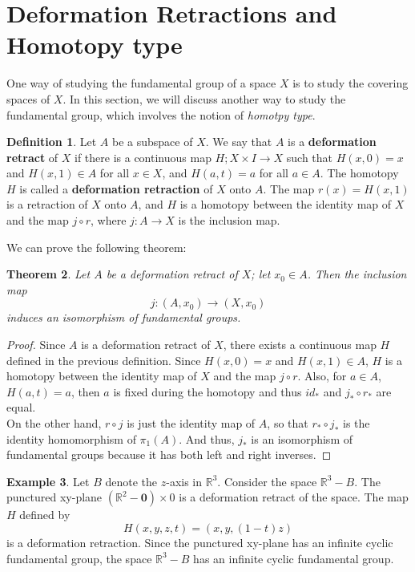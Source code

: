 \documentclass[psamsfonts]{amsart}
\newtheorem{thm}{Theorem}[section]
\theoremstyle{definition}
\newtheorem{defn}[thm]{Definition}
\newtheorem{exmp}[thm]{Example}
\theoremstyle{remark}
\numberwithin{equation}{section}
\begin{document}
\section{Deformation Retractions and Homotopy type}
	One way of studying the fundamental group of a space $X$ is to study the covering spaces of $X$. In this section, we will discuss another way to study the fundamental group, which involves the notion of \textit{homotpy type}.
	\begin{defn}
		Let $A$ be a subspace of $X$. We say that $A$ is a \textbf{deformation retract} of $X$ if there is a continuous map $H ; X \times I \to X$ such that $H(x,0)=x$ and $H(x,1)\in A$ for all $x \in X$, and $H(a,t)=a$ for all $a \in A$. The homotopy $H$ is called a \textbf{deformation retraction} of $X$ onto $A$. The map $r(x) = H(x,1)$ is a retraction of $X$ onto $A$, and $H$ is a homotopy between the identity map of $X$ and the map $j \circ r$, where $j:A \to X$ is the inclusion map.
	\end{defn}
	
	We can prove the following theorem:
	\begin{thm}
		Let $A$ be a deformation retract of $X$; let $x_0 \in A$. Then the inclusion map 
		\begin{equation}
			j:(A,x_0) \to (X,x_0)
		\end{equation}
		induces an isomorphism of fundamental groups.		 
	\end{thm}
	\begin{proof}
		Since $A$ is a deformation retract of $X$, there exists a continuous map $H$ defined in the previous definition. Since $H(x,0)=x$ and $H(x,1) \in A$, $H$ is a homotopy between the identity map of $X$ and the map $j \circ r$. Also, for $a \in A$, $H(a,t)=a$, then $a$ is fixed during the homotopy and thus $id_*$ and $j_* \circ r_*$ are equal.\\
		On the other hand, $r \circ j$ is just the identity map of $A$, so that $r_* \circ j_*$ is the identity homomorphism of $\pi_1(A)$. And thus, $j_*$ is an isomorphism of fundamental groups because it has both left and right inverses.
	\end{proof}
	
	\begin{exmp}
		Let $B$ denote the $z$-axis in $\mathbb{R}^3$. Consider the space $\mathbb{R}^3-B$. The punctured xy-plane $(\mathbb{R}^2-\textbf{0}) \times 0$ is a deformation retract of the space. The map $H$ defined by
		\begin{equation}
			H(x,y,z,t) = (x,y,(1-t)z)
		\end{equation}
		is a deformation retraction. Since the punctured xy-plane has an infinite cyclic fundamental group, the space $\mathbb{R}^3-B$ has an infinite cyclic fundamental group.
	\end{exmp}
	
\end{document}
